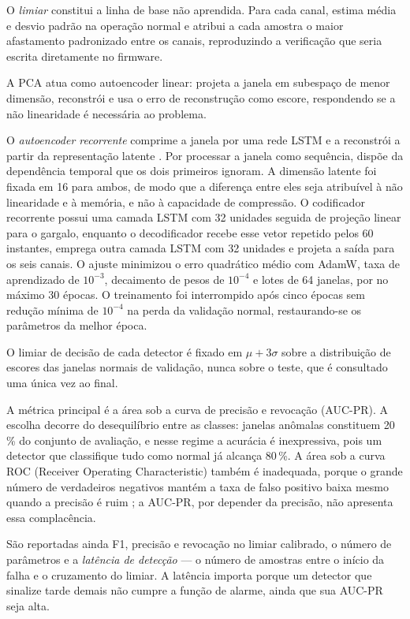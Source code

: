 \documentclass[conference]{IEEEtran}
\begin{document}
O \emph{limiar} constitui a linha de base não aprendida.
Para cada canal, estima média e desvio padrão na operação normal e atribui a cada amostra o maior afastamento padronizado entre os canais, reproduzindo a verificação que seria escrita diretamente no firmware.

A PCA atua como autoencoder linear: projeta a janela em subespaço de menor dimensão, reconstrói e usa o erro de reconstrução como escore, respondendo se a não linearidade é necessária ao problema.

O \emph{autoencoder recorrente} comprime a janela por uma rede LSTM \cite{hochreiter1997lstm} e a reconstrói a partir da representação latente \cite{goodfellow2016deep}.
Por processar a janela como sequência, dispõe da dependência temporal que os dois primeiros ignoram.
A dimensão latente foi fixada em 16 para ambos, de modo que a diferença entre eles seja atribuível à não linearidade e à memória, e não à capacidade de compressão.
O codificador recorrente possui uma camada LSTM com 32 unidades seguida de projeção linear para o gargalo, enquanto o decodificador recebe esse vetor repetido pelos 60 instantes, emprega outra camada LSTM com 32 unidades e projeta a saída para os seis canais.
O ajuste minimizou o erro quadrático médio com AdamW, taxa de aprendizado de $10^{-3}$, decaimento de pesos de $10^{-4}$ e lotes de 64 janelas, por no máximo 30 épocas.
O treinamento foi interrompido após cinco épocas sem redução mínima de $10^{-4}$ na perda da validação normal, restaurando-se os parâmetros da melhor época.


O limiar de decisão de cada detector é fixado em $\mu + 3\sigma$ sobre a distribuição de escores das janelas normais de validação, nunca sobre o teste, que é consultado uma única vez ao final.

A métrica principal é a área sob a curva de precisão e revocação (AUC-PR).
A escolha decorre do desequilíbrio entre as classes: janelas anômalas constituem 20\,\% do conjunto de avaliação, e nesse regime a acurácia é inexpressiva, pois um detector que classifique tudo como normal já alcança 80\,\%.
A área sob a curva ROC (Receiver Operating Characteristic) também é inadequada, porque o grande número de verdadeiros negativos mantém a taxa de falso positivo baixa mesmo quando a precisão é ruim \cite{saito2015precision}; a AUC-PR, por depender da precisão, não apresenta essa complacência.

São reportadas ainda F1, precisão e revocação no limiar calibrado, o número de parâmetros e a \emph{latência de detecção} --- o número de amostras entre o início da falha e o cruzamento do limiar.
A latência importa porque um detector que sinalize tarde demais não cumpre a função de alarme, ainda que sua AUC-PR seja alta.
\end{document}
